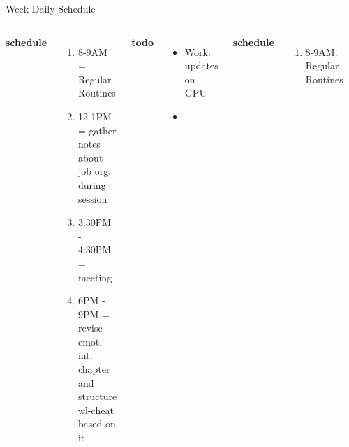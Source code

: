 \begin{frame}
\begin{columns}
\begin{column}{0.50\linewidth}
\begin{block}{Week Daily Schedule}
\begin{columns}
          \textbf{\small schedule}\\
          \begin{enumerate} 
            \tiny \item \tiny 8-9AM = Regular Routines 
            \item \tiny 12-1PM = gather notes about job org. during
              session 
            \item \tiny 3:30PM - 4:30PM = meeting 
            \item \tiny 6PM - 9PM = revise emot. int. chapter and
              structure wl-cheat based on it 
          \end{enumerate} 
          
          \textbf{\small todo}\\ 
          \begin{itemize}
            \tiny \item \tiny Work: updates on GPU \dl{} \te{} \prio{}
          \item \tiny {} 
          \end{itemize}
          \textbf{\small schedule}\\
          \begin{enumerate}
            \tiny \item \tiny 8-9AM: Regular Routines 
          \end{enumerate}
          
          \textbf{\small todo}\\
          \begin{itemize} 
            \tiny \item \tiny
          \end{itemize}
          \textbf{\small schedule}\\ 
          \begin{enumerate}
            \tiny \item \tiny 7-7:30PM = food + organize.  
            \tiny \item \tiny 7:30PM -8PM = 
            \tiny \item \tiny 8PM -9PM = 
            \tiny \item \tiny 9:45PM - 10:30PM = go out 
            \tiny \item \tiny 2AM -3AM =  message Samir + add people
          \end{enumerate}
          

\end{columns}
\end{block}
\end{column}
\end{columns}
\end{frame}
